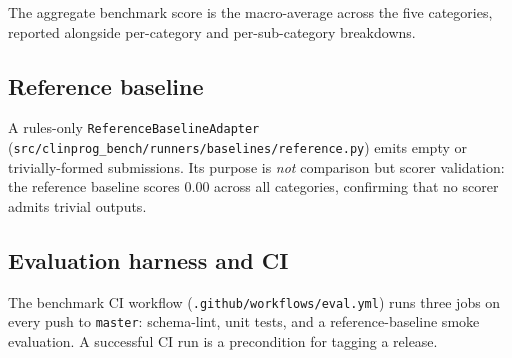The aggregate benchmark score is the macro-average across the five
categories, reported alongside per-category and per-sub-category breakdowns.

\subsection{Reference baseline}

A rules-only \texttt{ReferenceBaselineAdapter}
(\texttt{src/clinprog\_bench/runners/baselines/reference.py}) emits empty
or trivially-formed submissions. Its purpose is \emph{not} comparison but
scorer validation: the reference baseline scores $0.00$ across all
categories, confirming that no scorer admits trivial outputs.

\subsection{Evaluation harness and CI}

The benchmark CI workflow (\texttt{.github/workflows/eval.yml}) runs three
jobs on every push to \texttt{master}: schema-lint, unit tests, and a
reference-baseline smoke evaluation. A successful CI run is a precondition
for tagging a release.

